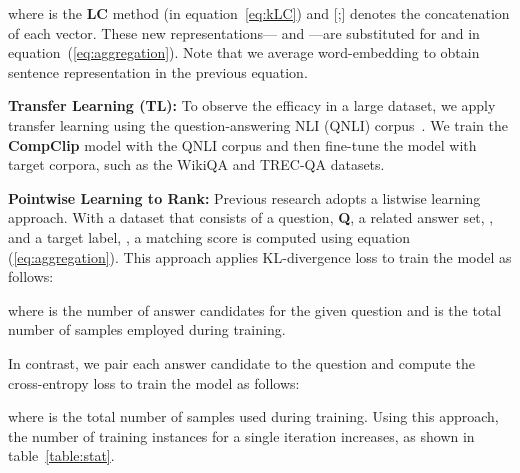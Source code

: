 \documentclass[sigconf]{acmart}
\begin{document}
where  is the \textbf{LC} method (in equation~\ref{eq:kLC}) and [;] denotes the concatenation of each vector.
These new representations— and —are substituted for  and  in equation~(\ref{eq:aggregation}).
Note that we average word-embedding to obtain sentence representation in the previous equation.


\vspace*{2mm}
\noindent\textbf{Transfer Learning (TL): }
To observe the efficacy in a large dataset, we apply transfer learning using the question-answering NLI (QNLI) corpus~\cite{wang2018glue}.
We train the \textbf{CompClip} model with the QNLI corpus and then fine-tune the model with target corpora, such as the WikiQA and TREC-QA datasets.

\vspace*{2mm}
\noindent\textbf{Pointwise Learning to Rank: }
Previous research adopts a listwise learning approach.
With a dataset that consists of a question, \textbf{Q}, a related answer set, , and a target label, , a matching score is computed using equation (\ref{eq:aggregation}).
This approach applies KL-divergence loss to train the model as follows:

where  is the number of answer candidates for the given question and  is the total number of samples employed during training.



In contrast, we pair each answer candidate to the question and compute the cross-entropy loss to train the model as follows:

where  is the total number of samples used during training. 
Using this approach, the number of training instances for a single iteration increases, as shown in table~\ref{table:stat}.
\end{document}
